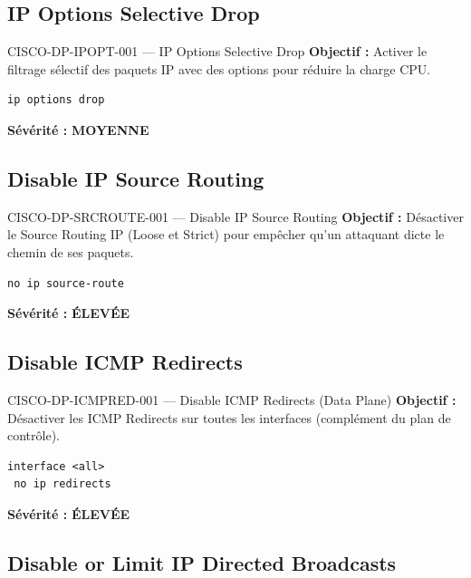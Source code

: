 \documentclass[12pt, a4paper]{report}
\begin{document}
\subsection{IP Options Selective Drop}

\begin{rulebox}{CISCO-DP-IPOPT-001 — IP Options Selective Drop}
  \textbf{Objectif :} Activer le filtrage sélectif des paquets IP avec des options pour réduire la charge CPU.

  \begin{lstlisting}
ip options drop
  \end{lstlisting}

  \textbf{Sévérité :} \textcolor{accentGreen}{\textbf{MOYENNE}}
\end{rulebox}

\subsection{Disable IP Source Routing}

\begin{rulebox}{CISCO-DP-SRCROUTE-001 — Disable IP Source Routing}
  \textbf{Objectif :} Désactiver le Source Routing IP (Loose et Strict) pour empêcher qu'un attaquant dicte le chemin de ses paquets.

  \begin{lstlisting}
no ip source-route
  \end{lstlisting}

  \textbf{Sévérité :} \textcolor{accentOrange}{\textbf{ÉLEVÉE}}
\end{rulebox}

\subsection{Disable ICMP Redirects}

\begin{rulebox}{CISCO-DP-ICMPRED-001 — Disable ICMP Redirects (Data Plane)}
  \textbf{Objectif :} Désactiver les ICMP Redirects sur toutes les interfaces (complément du plan de contrôle).

  \begin{lstlisting}
interface <all>
 no ip redirects
  \end{lstlisting}

  \textbf{Sévérité :} \textcolor{accentOrange}{\textbf{ÉLEVÉE}}
\end{rulebox}

\subsection{Disable or Limit IP Directed Broadcasts}
\end{document}
